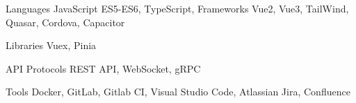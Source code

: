 

\begin{cvskills}

  \cvskill
    {Languages} %
    {JavaScript ES5-ES6, TypeScript, } %
  \cvskill
    {Frameworks} %
    {Vue2, Vue3, TailWind, Quasar, Cordova, Capacitor} %

  \cvskill
    {Libraries} %
    {Vuex, Pinia} %

  \cvskill
    {API Protocols} %
    {REST API, WebSocket, gRPC} %

  \cvskill
    {Tools} %
    {Docker, GitLab, Gitlab CI, Visual Studio Code, Atlassian Jira, Confluence} %

\end{cvskills}
